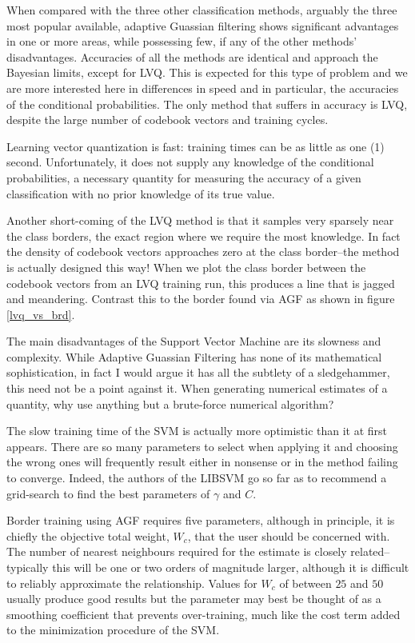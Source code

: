 When compared with the three other classification methods,
arguably the three most popular available, adaptive
Guassian filtering shows significant advantages in one or
more areas, while possessing few, if any of the other methods'
disadvantages.  
Accuracies of all the methods are identical and approach the Bayesian
limits, except for LVQ.
This is expected for this type of problem and
we are more interested here in differences in speed and in
particular, the accuracies of the conditional probabilities.
The only method that suffers in accuracy is LVQ, despite
the large number of codebook vectors and training cycles.

Learning vector quantization is fast:  training times can
be as little as one (1) second.
Unfortunately, it does not supply any knowledge of the
conditional probabilities, a necessary quantity for measuring
the accuracy of a given classification with no prior knowledge
of its true value.

Another short-coming of the LVQ method is that it samples very
sparsely near the class borders, the exact region where we
require the most knowledge.  In fact the density of codebook
vectors approaches zero at the class border--the method is
actually designed this way!  When we plot the class border
between the codebook vectors from an LVQ training run, this
produces a line that is jagged and meandering.  Contrast this
to the border found via AGF as shown in figure \ref{lvq_vs_brd}.

The main disadvantages of the Support Vector Machine are its slowness
and complexity.  While Adaptive Guassian Filtering has none of
its mathematical sophistication, in fact
I would argue it has all the subtlety of a sledgehammer,
this need not be a point against it.  When generating
numerical estimates of a quantity, why use anything but a
brute-force numerical algorithm?

The slow training time
of the SVM is actually more optimistic than it at first 
appears.  There are so many parameters to select
when applying it and choosing the wrong ones will
frequently result either in nonsense or in the method
failing to converge.  Indeed, the authors of the LIBSVM
go so far as to recommend a grid-search to find the best parameters
of $\gamma$ and $C$. \cite{LIBSVM_guide}

Border training using AGF requires five
parameters, although in principle, it is chiefly
the objective total weight, $W_c$, that the user should
be concerned with.  
The number of nearest neighbours required for the estimate
is closely related--
typically this will be one or two orders of magnitude
larger, although it is difficult to 
reliably approximate the relationship.
Values for $W_c$
of between $25$ and $50$ usually produce good results
but the parameter may best be thought of as a smoothing
coefficient that prevents over-training, much like the
cost term added to the minimization 
procedure of the SVM. \cite{Mueller_etal2001}

